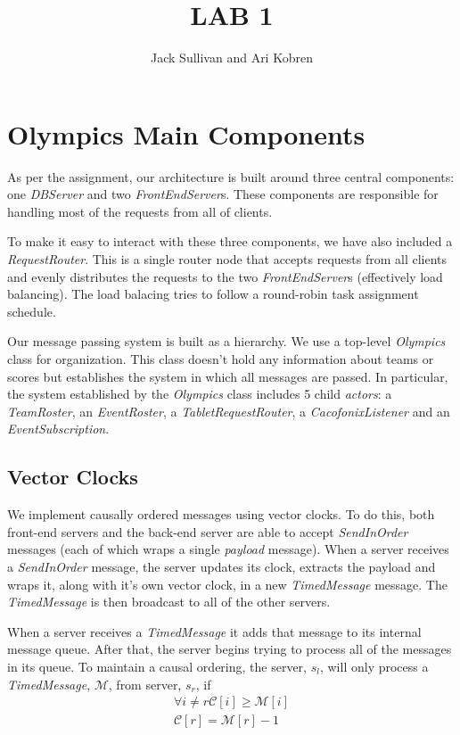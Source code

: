 \documentclass[11pt]{article}
\begin{document}
\title{LAB 1}
\author{Jack Sullivan and Ari Kobren}
\maketitle

\section{Olympics Main Components}
As per the assignment, our architecture is built around three central
components: one \emph{DBServer} and two \emph{FrontEndServer}s. These
components are responsible for handling most of the requests from all
of clients.

To make it easy to interact with these three components, we have also
included a \emph{RequestRouter}.  This is a single router node that
accepts requests from all clients and evenly distributes the requests
to the two \emph{FrontEndServer}s (effectively load balancing). The
load balacing tries to follow a round-robin task assignment schedule.

Our message passing system is built as a hierarchy. We use a top-level
\emph{Olympics} class for organization.  This class doesn't hold any
information about teams or scores but establishes the system in which
all messages are passed.  In particular, the system established by the
\emph{Olympics} class includes 5 child \emph{actors}: a
\emph{TeamRoster}, an \emph{EventRoster}, a
\emph{TabletRequestRouter}, a \emph{CacofonixListener} and an
\emph{EventSubscription}.

\subsection{Vector Clocks}
We implement causally ordered messages using vector clocks.  To do
this, both front-end servers and the back-end server are able to
accept \emph{SendInOrder} messages (each of which wraps a single
\emph{payload} message).  When a server receives a \emph{SendInOrder}
message, the server updates its clock, extracts the payload and wraps
it, along with it's own vector clock, in a new \emph{TimedMessage}
message.  The \emph{TimedMessage} is then broadcast to all of the
other servers.

When a server receives a \emph{TimedMessage} it adds that message to
its internal message queue. After that, the server begins trying to
process all of the messages in its queue.  To maintain a causal
ordering, the server, $s_l$, will only process a \emph{TimedMessage},
$\mathcal{M}$, from server, $s_r$, if
\begin{align*}
 \forall i \ne r \mathcal{C}[i] \ge \mathcal{M}[i] \\
 \mathcal{C}[r] = \mathcal{M}[r] - 1
\end{align*}
\end{document}
